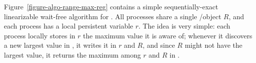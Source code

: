 Figure~\ref{figure-algo-range-max-reg} contains a simple sequentially-exact linearizable wait-free algorithm for \RangeMaxReg.  All processes share a single \R/\W object \(R\), and each process has a local persistent variable \(r\).  The idea is very simple: each process locally stores in \(r\) the maximum value it is aware of; whenever it discovers a new largest value in \RMaxW, it writes it in \(r\) and \(R\), and since \(R\) might not have the largest value, it returns the maximum among \(r\) and \(R\) in \RMaxR.


\begin{figure}[!ht]
\end{figure}

